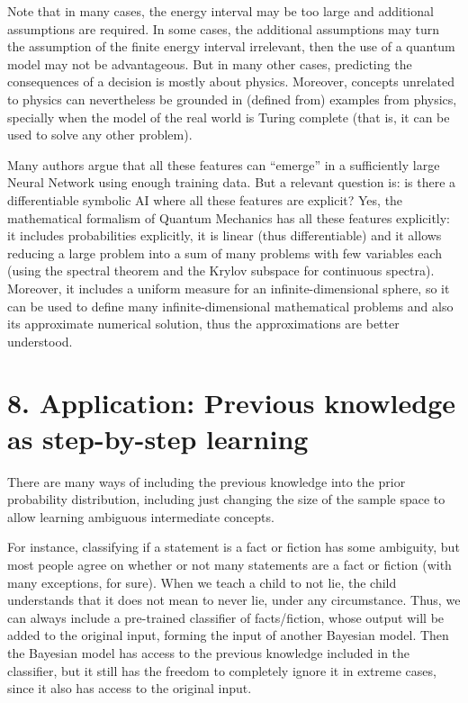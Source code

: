 \documentclass[11pt]{book}
\begin{document}
Note that in many cases, the energy interval may be too large and
additional assumptions are required. In some cases, the additional
assumptions may turn the assumption of the finite energy interval
irrelevant, then the use of a quantum model may not be advantageous. But
in many other cases, predicting the consequences of a decision is mostly
about physics. Moreover, concepts unrelated to physics can nevertheless
be grounded in (defined from) examples from physics, specially when the
model of the real world is Turing complete (that is, it can be used to
solve any other problem).

Many authors argue that all these features can ``emerge'' in a
sufficiently large Neural Network using enough training data. But a
relevant question is: is there a differentiable symbolic AI where all
these features are explicit? Yes, the mathematical formalism of Quantum
Mechanics has all these features explicitly: it includes probabilities
explicitly, it is linear (thus differentiable) and it allows reducing a
large problem into a sum of many problems with few variables each (using
the spectral theorem and the Krylov subspace for continuous spectra).
Moreover, it includes a uniform measure for an infinite-dimensional
sphere, so it can be used to define many infinite-dimensional
mathematical problems and also its approximate numerical solution, thus
the approximations are better understood.

\hypertarget{application-previous-knowledge-as-step-by-step-learning}{%
\section{8. Application: Previous knowledge as step-by-step
learning}\label{application-previous-knowledge-as-step-by-step-learning}}

There are many ways of including the previous knowledge into the prior
probability distribution\cite{jin_lifelong_2022}\cite{ding_parameter-efficient_2023}, including just changing the size of the sample space to
allow learning ambiguous intermediate concepts.

For instance, classifying if a statement is a fact or fiction has some
ambiguity, but most people agree on whether or not many statements are a
fact or fiction (with many exceptions, for sure). When we teach a child
to not lie, the child understands that it does not mean to never lie,
under any circumstance. Thus, we can always include a pre-trained
classifier of facts/fiction, whose output will be added to the original
input, forming the input of another Bayesian model. Then the Bayesian
model has access to the previous knowledge included in the classifier,
but it still has the freedom to completely ignore it in extreme cases,
since it also has access to the original input.
\end{document}
